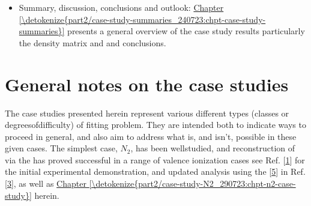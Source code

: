 \documentclass[letterpaper,table,10pt,english]{jupyterBook}
\begin{document}
\begin{itemize}
\begin{itemize}
\item {} 
\sphinxAtStartPar
\hyperref[\detokenize{part2/case-study-C2H4_290723:chpt-c2h4-case-study}]{Chapter \ref{\detokenize{part2/case-study-C2H4_290723:chpt-c2h4-case-study}}:} {\hyperref[\detokenize{part2/case-study-C2H4_290723:chpt-c2h4-case-study}]{}}: The most general example of an asymmetric top system, in this case \(C_2H_4\) (ethylene), \(C_{2h}\). Again various cases and limitations are examined, for 1D and 3D alignment.

\end{itemize}

\item {} 
\sphinxAtStartPar
Summary, discussion, conclusions and outlook: \hyperref[\detokenize{part2/case-study-summaries_240723:chpt-case-study-summaries}]{Chapter \ref{\detokenize{part2/case-study-summaries_240723:chpt-case-study-summaries}}} presents a general overview of the case study results \sphinxhyphen{} particularly the density matrix and {\hyperref[\detokenize{backmatter/glossary:term-MF}]{}} \sphinxhyphen{} and conclusions.

\end{itemize}


\section{General notes on the case studies}
\label{\detokenize{part2/extracting_matrix_elements_overview_270423:general-notes-on-the-case-studies}}
\sphinxAtStartPar
The case studies presented herein represent various different types (classes or degrees\sphinxhyphen{}of\sphinxhyphen{}difficulty) of fitting problem. They are intended both to indicate ways to proceed in general, and also aim to address what is, and isn’t, possible in these given cases. The simplest case, \(N_2\), has been well\sphinxhyphen{}studied, and reconstruction of {\hyperref[\detokenize{backmatter/glossary:term-radial-matrix-elements}]{}} via the {\hyperref[\detokenize{backmatter/glossary:term-bootstrap-retrieval-protocol}]{}} has proved successful in a range of valence ionization cases \sphinxhyphen{} see Ref. {[}\hyperlink{cite.backmatter/bibliography:id776}{1}{]} for the initial experimental demonstration, and updated analysis using the  {[}\hyperlink{cite.backmatter/bibliography:id682}{5}{]} in Ref. {[}\hyperlink{cite.backmatter/bibliography:id686}{3}{]}, as well as \hyperref[\detokenize{part2/case-study-N2_290723:chpt-n2-case-study}]{Chapter \ref{\detokenize{part2/case-study-N2_290723:chpt-n2-case-study}}} herein.
\end{document}
